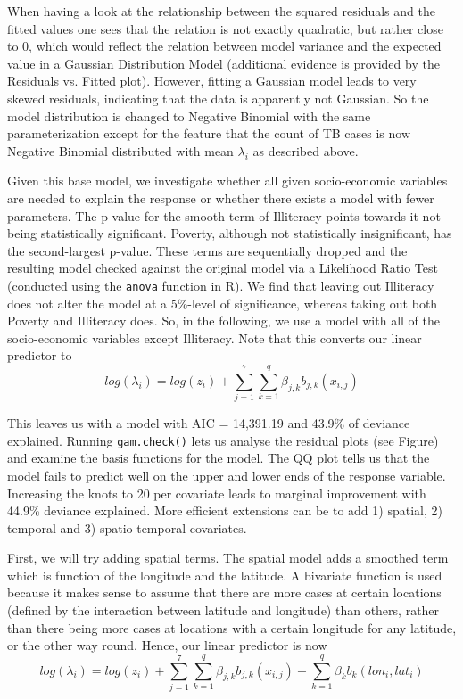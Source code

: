 When having a look at the relationship between the squared residuals and the fitted values one sees that the relation is not exactly quadratic, but rather close to 0, which would reflect the relation between model variance and the expected value in a Gaussian Distribution Model (additional evidence is provided by the Residuals vs. Fitted plot). However, fitting a Gaussian model leads to very skewed residuals, indicating that the data is apparently not Gaussian. So the model distribution is changed to Negative Binomial with the same parameterization except for the feature that the count of TB cases is now Negative Binomial distributed with mean $\lambda_{i}$ as described above.
\newline

Given this base model, we investigate whether all given socio-economic variables are needed to explain the response or whether there exists a model with fewer parameters. The p-value for the smooth term of Illiteracy points towards it not being statistically significant. Poverty, although not statistically insignificant, has the second-largest p-value. These terms are sequentially dropped and the resulting model checked against the original model via a Likelihood Ratio Test (conducted using the \texttt{anova} function in R). We find that leaving out Illiteracy does not alter the model at a 5\%-level of significance, whereas taking out both Poverty and Illiteracy does. So, in the following, we use a model with all of the socio-economic variables except Illiteracy. Note that this converts our linear predictor to 
$$
log(\lambda_i) = log(z_i) +  \sum_{j=1}^{7}\sum_{k=1}^{q}\beta_{j,k}b_{j,k}(x_{i,j})
$$
\newline

This leaves us with a model with AIC = 14,391.19 and 43.9\% of deviance explained. Running \texttt{gam.check()} lets us analyse the residual plots (see Figure) and examine the basis functions for the model. The QQ plot tells us that the model fails to predict well on the upper and lower ends of the response variable. Increasing the knots to 20 per covariate leads to marginal improvement with 44.9\% deviance explained. More efficient extensions can be to add 1) spatial, 2) temporal and 3) spatio-temporal covariates.
\newline

First, we will try adding spatial terms. The spatial model adds a smoothed term which is function of the longitude and the latitude. A bivariate function is used because it makes sense to assume that there are more cases at certain locations (defined by the interaction between latitude and longitude) than others, rather than there being more cases at
locations with a certain longitude for any latitude, or the other way round. Hence, our linear predictor is now
$$
log(\lambda_i) = log(z_i) +  \sum_{j=1}^{7}\sum_{k=1}^{q}\beta_{j,k}b_{j,k}(x_{i,j}) + \sum_{k=1}^{q}\beta_{k}b_{k}(lon_i , lat_i) 
$$
\newline

